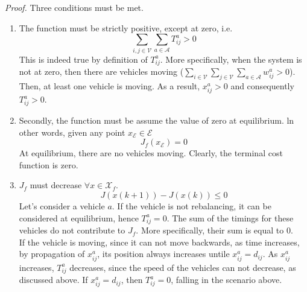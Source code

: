 \textit{Proof. } Three conditions must be met.\\
\begin{enumerate}
	\item The function must be strictly positive, except at zero, i.e.
	\begin{equation*}
		\sum_{i,j \in \mathcal{V}}\sum_{a \in\mathcal{A}}T_{ij}^a >0
	\end{equation*}
	This is indeed true by definition of $T_{ij}^a$. More specifically, when the system is not at zero, then there are vehicles moving ($\sum_{i \in \mathcal{V}}\sum_{j \in \mathcal{V}}\sum_{a \in\mathcal{A}}w_{ij}^a >0$). Then, at least one vehicle is moving. As a result, $x_{ij}^a >0$ and consequently $T_{ij}^a>0$. \\
	\item Secondly, the function must be assume the value of zero at equilibrium. ln other words, given any point $x_{\mathcal{E}}\in\mathcal{E}$
	\begin{equation*}
		J_f(x_{\mathcal{E}}) = 0
	\end{equation*}
	At equilibrium, there are no vehicles moving. Clearly, the terminal cost function is zero. 
	\item $J_f$ must decrease $\forall x \in \mathcal{X}_f$. 
	\begin{equation*}
		J(x(k+1)) - J(x(k))\leq 0
	\end{equation*}
	Let's consider a vehicle $a$. If the vehicle is not rebalancing, it can be considered at equilibrium, hence $T^a_{ij} = 0$. The sum of the timings for these vehicles do not contribute to $J_f$. More specifically, their sum is equal to 0.\\
	If the vehicle is moving, since it can not move backwards, as time increases, by propagation of $x_{ij}^a$, its position always increases untile $x_{ij}^a = d_{ij}$. As $x_{ij}^a$ increases, $T_{ij}^a$ decreases, since the speed of the vehicles can not decrease, as discussed above. If $x_{ij}^a = d_{ij}$, then $T_{ij}^a=0$, falling in the scenario above.

	

\end{enumerate}



